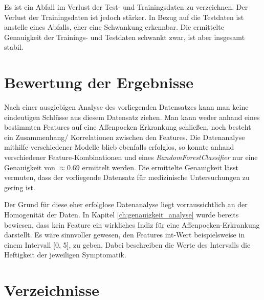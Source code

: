 \documentclass[13pt,a4paper, listof=entryprefix, bibliography=totocnumbered,toc=listofnumbered,lof=listofnumbered]{scrartcl}
\newcounter{verzeichnis}
\begin{document}
Es ist ein Abfall im Verlust der Test- und Trainingsdaten zu verzeichnen. Der Verlust der Trainingsdaten ist jedoch stärker. 
In Bezug auf die Testdaten ist anstelle eines Abfalls, eher eine Schwankung erkennbar. Die ermittelte Genauigkeit der Trainings- und Testdaten 
schwankt zwar, ist aber insgesamt stabil. 


	\section{Bewertung der Ergebnisse}
		\label{ch:bewertungs_ergebnisse}

Nach einer ausgiebigen Analyse des vorliegenden Datensatzes kann man keine eindeutigen Schlüsse aus diesem Datensatz ziehen.
Man kann weder anhand eines bestimmten Features auf eine Affenpocken Erkrankung schließen, noch besteht ein Zusammenhang/ Korrelationen
zwischen den Features. Die Datenanalyse mithilfe verschiedener Modelle blieb ebenfalls erfolglos, so konnte anhand verschiedener 
Feature-Kombinationen und eines \textit{RandomForestClassifier} nur eine Genauigkeit von $\approx 0.69$ ermittelt werden. Die
ermittelte Genauigkeit lässt vermuten, dass der vorliegende Datensatz für medizinische Untersuchungen zu gering ist. 

Der Grund für diese eher erfolglose Datenanalyse liegt vorraussichtlich an der Homogenität der Daten. 
In Kapitel \ref{ch:genauigkeit_analyse} wurde bereits bewiesen, dass kein Feature ein wirkliches Indiz für eine 
Affenpocken-Erkrankung darstellt. Es wäre sinnvoller gewesen, den Features int-Wert beispielsweise in einem Intervall [0, 5], 
zu geben. Dabei beschreiben die Werte des Intervalls die Heftigkeit der jeweiligen Symptomatik.


		\pagebreak

		 \label{Verzeichnisse}
		\renewcommand{\thesection}{\Roman{verzeichnis}}
		\section*{Verzeichnisse} 

		\listoffigures
		\pagebreak

		\listoftables
		\pagebreak

\vspace{-3em}


    
\pagebreak

	
\end{document}
